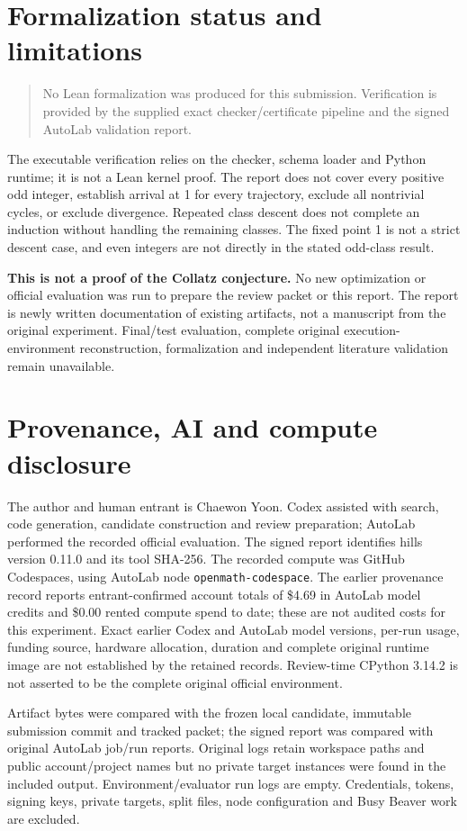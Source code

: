 \documentclass[10pt]{article}
\begin{document}
\section{Formalization status and limitations}
\begin{quote}
No Lean formalization was produced for this submission. Verification is provided by the supplied exact checker/certificate pipeline and the signed AutoLab validation report.
\end{quote}
The executable verification relies on the checker, schema loader and Python runtime; it is not a Lean kernel proof. The report does not cover every positive odd integer, establish arrival at 1 for every trajectory, exclude all nontrivial cycles, or exclude divergence. Repeated class descent does not complete an induction without handling the remaining classes. The fixed point 1 is not a strict descent case, and even integers are not directly in the stated odd-class result.

\textbf{This is not a proof of the Collatz conjecture.} No new optimization or official evaluation was run to prepare the review packet or this report. The report is newly written documentation of existing artifacts, not a manuscript from the original experiment. Final/test evaluation, complete original execution-environment reconstruction, formalization and independent literature validation remain unavailable.

\section{Provenance, AI and compute disclosure}
The author and human entrant is Chaewon Yoon. Codex assisted with search, code generation, candidate construction and review preparation; AutoLab performed the recorded official evaluation. The signed report identifies hills version 0.11.0 and its tool SHA-256. The recorded compute was GitHub Codespaces, using AutoLab node \texttt{openmath-codespace}. The earlier provenance record reports entrant-confirmed account totals of \$4.69 in AutoLab model credits and \$0.00 rented compute spend to date; these are not audited costs for this experiment. Exact earlier Codex and AutoLab model versions, per-run usage, funding source, hardware allocation, duration and complete original runtime image are not established by the retained records. Review-time CPython 3.14.2 is not asserted to be the complete original official environment.

Artifact bytes were compared with the frozen local candidate, immutable submission commit and tracked packet; the signed report was compared with original AutoLab job/run reports. Original logs retain workspace paths and public account/project names but no private target instances were found in the included output. Environment/evaluator run logs are empty. Credentials, tokens, signing keys, private targets, split files, node configuration and Busy Beaver work are excluded.
\end{document}
